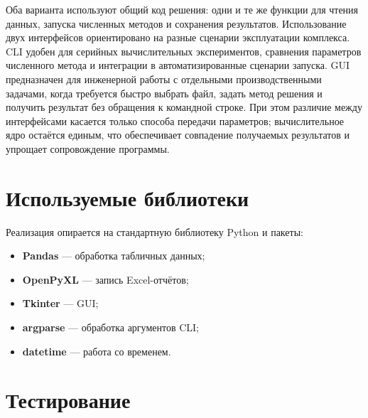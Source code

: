 Оба варианта используют общий код решения: одни и те же функции для чтения данных, запуска численных методов и сохранения результатов.
Использование двух интерфейсов ориентировано на разные сценарии эксплуатации комплекса. CLI удобен для серийных вычислительных экспериментов, сравнения параметров численного метода и интеграции в автоматизированные сценарии запуска. GUI предназначен для инженерной работы с отдельными производственными задачами, когда требуется быстро выбрать файл, задать метод решения и получить результат без обращения к командной строке. При этом различие между интерфейсами касается только способа передачи параметров; вычислительное ядро остаётся единым, что обеспечивает совпадение получаемых результатов и упрощает сопровождение программы.

\section{Используемые библиотеки}\label{sec:software/libs}

Реализация опирается на стандартную библиотеку Python и пакеты:
\begin{itemize}
    \item \textbf{Pandas} --- обработка табличных данных;
    \item \textbf{OpenPyXL} --- запись Excel-отчётов;
    \item \textbf{Tkinter} --- GUI;
    \item \textbf{argparse} --- обработка аргументов CLI;
    \item \textbf{datetime} --- работа со временем.
\end{itemize}

\section{Тестирование}\label{sec:software/tests}

